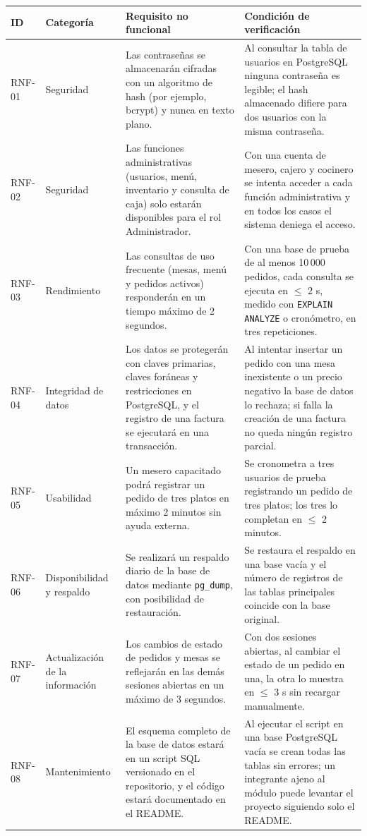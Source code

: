 \documentclass[12pt,a4paper,oneside]{article}
\begin{document}
{\small\renewcommand{\arraystretch}{1.2}
\begin{longtable}{P{1.5cm}P{2.2cm}P{4.3cm}P{6.0cm}}
\toprule
\textbf{ID} & \textbf{Categoría} & \textbf{Requisito no funcional} & \textbf{Condición de verificación} \\ \midrule
\endhead
RNF-01 & Seguridad & Las contraseñas se almacenarán cifradas con un algoritmo de hash (por ejemplo, bcrypt) y nunca en texto plano. & Al consultar la tabla de usuarios en PostgreSQL ninguna contraseña es legible; el hash almacenado difiere para dos usuarios con la misma contraseña. \\ \midrule
RNF-02 & Seguridad & Las funciones administrativas (usuarios, menú, inventario y consulta de caja) solo estarán disponibles para el rol Administrador. & Con una cuenta de mesero, cajero y cocinero se intenta acceder a cada función administrativa y en todos los casos el sistema deniega el acceso. \\ \midrule
RNF-03 & Rendimiento & Las consultas de uso frecuente (mesas, menú y pedidos activos) responderán en un tiempo máximo de 2 segundos. & Con una base de prueba de al menos 10\,000 pedidos, cada consulta se ejecuta en $\leq$ 2 s, medido con \texttt{EXPLAIN ANALYZE} o cronómetro, en tres repeticiones. \\ \midrule
RNF-04 & Integridad de datos & Los datos se protegerán con claves primarias, claves foráneas y restricciones en PostgreSQL, y el registro de una factura se ejecutará en una transacción. & Al intentar insertar un pedido con una mesa inexistente o un precio negativo la base de datos lo rechaza; si falla la creación de una factura no queda ningún registro parcial. \\ \midrule
RNF-05 & Usabilidad & Un mesero capacitado podrá registrar un pedido de tres platos en máximo 2 minutos sin ayuda externa. & Se cronometra a tres usuarios de prueba registrando un pedido de tres platos; los tres lo completan en $\leq$ 2 minutos. \\ \midrule
RNF-06 & Disponibilidad y respaldo & Se realizará un respaldo diario de la base de datos mediante \texttt{pg\_dump}, con posibilidad de restauración. & Se restaura el respaldo en una base vacía y el número de registros de las tablas principales coincide con la base original. \\ \midrule
RNF-07 & Actualización de la información & Los cambios de estado de pedidos y mesas se reflejarán en las demás sesiones abiertas en un máximo de 3 segundos. & Con dos sesiones abiertas, al cambiar el estado de un pedido en una, la otra lo muestra en $\leq$ 3 s sin recargar manualmente. \\ \midrule
RNF-08 & Mantenimiento & El esquema completo de la base de datos estará en un script SQL versionado en el repositorio, y el código estará documentado en el README. & Al ejecutar el script en una base PostgreSQL vacía se crean todas las tablas sin errores; un integrante ajeno al módulo puede levantar el proyecto siguiendo solo el README. \\ \bottomrule
\end{longtable}}
\end{document}
